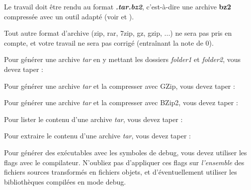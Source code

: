 


\noindent Le travail doit être rendu au format \textbf{\textit{.tar.bz2}}, c'est-à-dire une archive \textbf{bz2} compressée avec un outil adapté (voir  et ).

\noindent Tout autre format d'archive (zip, rar, 7zip, gz, gzip, ...) ne sera pas pris en compte, et votre travail ne sera pas corrigé (entraînant la note de 0).

\bigskip

\noindent Pour générer une archive \textit{tar} en y mettant les dossiers \textit{folder1} et \textit{folder2}, vous devez taper :



\bigskip


\noindent Pour générer une archive \textit{tar} et la compresser avec GZip, vous devez taper :



\bigskip


\noindent Pour générer une archive \textit{tar} et la compresser avec BZip2, vous devez taper :



\bigskip


\noindent Pour lister le contenu d'une archive \textit{tar}, vous devez taper :



\bigskip


\noindent Pour extraire le contenu d'une archive \textit{tar}, vous devez taper :



\vspace*{1cm}

\noindent Pour générer des exécutables avec les symboles de debug, vous devez utiliser les flags  avec le compilateur.
N'oubliez pas d'appliquer ces flags sur \textit{l'ensemble} des fichiers sources transformés en fichiers objets, et d'éventuellement utiliser les bibliothèques compilées en mode debug.

